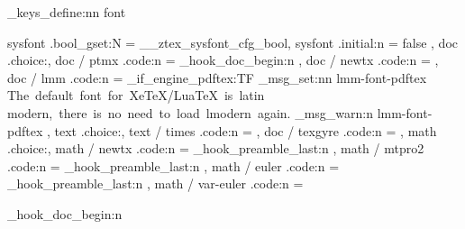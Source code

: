 \ztex_keys_define:nn { font }{
  sysfont         .bool_gset:N  = \g__ztex_sysfont_cfg_bool,
  sysfont         .initial:n    = { false },
  doc             .choice:,
  doc / ptmx      .code:n       = {
    \RequirePackage{mathptmx}
    \RequirePackage{newtxtext}
    \ztex_hook_doc_begin:n
      {
        \let\pi\new@pi
        \let\jmath\new@jmath
        \let\amalg\new@amalg
        \let\coprod\new@coprod
      }
  },
  doc / newtx    .code:n       = {
    \RequirePackage{newtxtext}
    \RequirePackage{newtxmath}
  },
  doc / lmm       .code:n      = {
    \sys_if_engine_pdftex:TF 
      { 
        \RequirePackage{lmodern}
        \RequirePackage{fixcmex} 
      }{ 
        \ztex_msg_set:nn {lmm-font-pdftex}
          {
            The~default~font~for~XeTeX/LuaTeX~is~latin~
            modern,~there~is~no~need~to~load~lmodern~again.
          }
        \ztex_msg_warn:n {lmm-font-pdftex} 
      }
  },
  text            .choice:,
  text / times    .code:n       = { \RequirePackage{newtxtext} },
  doc / texgyre   .code:n       = {  },  %
  math            .choice:,
  math / newtx    .code:n       = {
    \ztex_hook_preamble_last:n { \RequirePackage{newtxmath} } 
  },
  math / mtpro2   .code:n       = { 
    \ztex_hook_preamble_last:n { 
    } 
  },
  math / euler    .code:n       = { 
    \ztex_hook_preamble_last:n {  } 
  },
  math / var-euler .code:n       = {
    \usepackage[OT1]{eulervm}
    \ztex_hook_doc_begin:n
      {
        \DeclareRobustCommand\int {\new@int}
}}}
